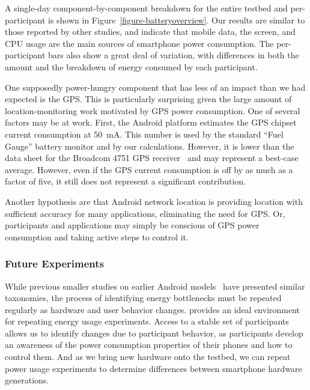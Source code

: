 A single-day component-by-component breakdown for the entire testbed and
per-participant is shown in Figure~\ref{figure-batteryoverview}. Our results
are similar to those reported by other studies, and indicate that mobile
data, the screen, and CPU usage are the main sources of smartphone power
consumption. The per-participant bars also show a great deal of variation,
with differences in both the amount and the breakdown of energy consumed by
each participant.

One supposedly power-hungry component that has less of an impact than we had
expected is the GPS. This is particularly surprising given the large amount
of location-monitoring work motivated by GPS power consumption. One of
several factors may be at work. First, the Android platform estimates the GPS
chipset current consumption at 50~mA. This number is used by the standard
``Fuel Gauge'' battery monitor and by our calculations. However, it is lower
than the data sheet for the Broadcom 4751 GPS receiver~\cite{bcm4751} and may
represent a best-case average. However, even if the GPS current consumption
is off by as much as a factor of five, it still does not represent a
significant contribution.

Another hypothesis are that Android network location is providing location
with sufficient accuracy for many applications, eliminating the need for GPS.
Or, participants and applications may simply be conscious of GPS power
consumption and taking active steps to control it.

\subsubsection{Future Experiments}

While previous smaller studies on earlier Android
models~\cite{shye:micro:2009} have presented similar taxonomies, the process
of identifying energy bottlenecks must be repeated regularly as hardware and
user behavior changes. \PhoneLab{} provides an ideal environment for
repeating energy usage experiments. Access to a stable set of participants
allows us to identify changes due to participant behavior, as participants
develop an awareness of the power consumption properties of their phones and
how to control them. And as we bring new hardware onto the testbed, we can
repeat power usage experiments to determine differences between smartphone
hardware generations.
